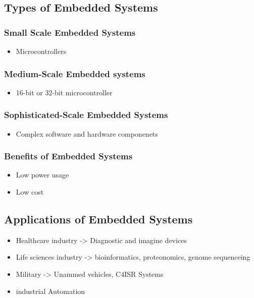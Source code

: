 \documentclass[11pt]{article}
\begin{document}
\subsection{Types of Embedded Systems}
\label{sec:org00a0896}
\subsubsection{Small Scale Embedded Systems}
\label{sec:org3fab9c8}
\begin{itemize}
\item Microcontrollers
\end{itemize}
\subsubsection{Medium-Scale Embedded systems}
\label{sec:orge6c85da}
\begin{itemize}
\item 16-bit or 32-bit microcontroller
\end{itemize}
\subsubsection{Sophisticated-Scale Embedded Systems}
\label{sec:org8a75e7d}
\begin{itemize}
\item Complex software and hardware componenets
\end{itemize}

\subsubsection{Benefits of Embedded Systems}
\label{sec:org4ec583e}
\begin{itemize}
\item Low power usage
\item Low cost
\end{itemize}

\subsection{Applications of Embedded Systems}
\label{sec:org77fb09a}
\begin{itemize}
\item Healthcare industry -> Diagnostic and imagine devices
\item Life sciences industry -> bioinformatics, proteonomics, genome sequenceing
\item Military -> Unammed vehicles, C4ISR Systems
\item industrial Automation
\end{itemize}
\end{document}
